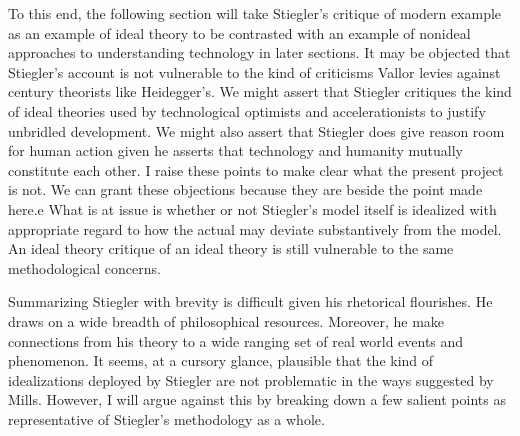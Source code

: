 \documentclass[letterpaper,notitlepage,12pt]{article}
\begin{document}
To this end, the following section will take Stiegler's critique of modern
example as an example of ideal theory to be contrasted with an example of
nonideal approaches to understanding technology in later sections.
It may be objected that Stiegler's account is not vulnerable to the kind of
criticisms Vallor levies against  century theorists like Heidegger's.
We might assert that Stiegler critiques the kind of ideal theories used by
technological optimists and accelerationists to justify unbridled development.
We might also assert that Stiegler does give reason room for human action given
he asserts that technology and humanity mutually constitute each other.
I raise these points to make clear what the present project is not.
We can grant these objections because they are beside the point made here.e
What is at issue is whether or not Stiegler's model itself is idealized with
appropriate regard to how the actual may deviate substantively from the model.
An ideal theory critique of an ideal theory is still vulnerable to the same
methodological concerns.

Summarizing Stiegler with brevity is difficult given his rhetorical flourishes.
He draws on a wide breadth of philosophical resources.
Moreover, he make connections from his theory to a wide ranging set of real
world events and phenomenon.
It seems, at a cursory glance, plausible that the kind of idealizations deployed
by Stiegler are not problematic in the ways suggested by Mills.
However, I will argue against this by breaking down a few salient points as
representative of Stiegler's methodology as a whole.
\end{document}
